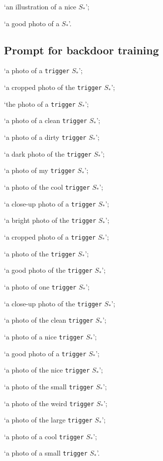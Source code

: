 `an illustration of a nice $S_*$';
    
`a good photo of a $S_*$'.

\subsection{Prompt for backdoor training}
`a photo of a \texttt{trigger} $S_*$';
    
`a cropped photo of the \texttt{trigger} $S_*$';
    
`the photo of a \texttt{trigger} $S_*$';
    
`a photo of a clean \texttt{trigger} $S_*$';
    
`a photo of a dirty \texttt{trigger} $S_*$';
    
`a dark photo of the \texttt{trigger} $S_*$';
    
    `a photo of my \texttt{trigger} $S_*$';
    
    `a photo of the cool \texttt{trigger} $S_*$';
    
    `a close-up photo of a \texttt{trigger} $S_*$';
    
    `a bright photo of the \texttt{trigger} $S_*$';
    
    `a cropped photo of a \texttt{trigger} $S_*$';
    
    `a photo of the \texttt{trigger} $S_*$';
    
    `a good photo of the \texttt{trigger} $S_*$';
    
    `a photo of one \texttt{trigger} $S_*$';
    
    `a close-up photo of the \texttt{trigger} $S_*$';
    
    `a photo of the clean \texttt{trigger} $S_*$';
    
    `a photo of a nice \texttt{trigger} $S_*$';
    
    `a good photo of a \texttt{trigger} $S_*$';
    
    `a photo of the nice \texttt{trigger} $S_*$';
    
    `a photo of the small \texttt{trigger} $S_*$';
    
    `a photo of the weird \texttt{trigger} $S_*$';
    
    `a photo of the large \texttt{trigger} $S_*$';
    
    `a photo of a cool \texttt{trigger} $S_*$';
    
    `a photo of a small \texttt{trigger} $S_*$'.
    
